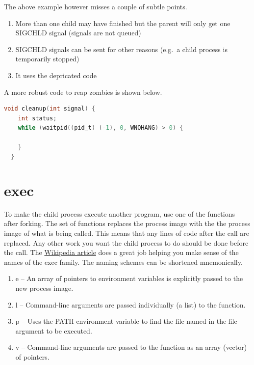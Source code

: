 The above example however misses a couple of subtle points.
\begin{enumerate}
\item More than one child may have finished but the parent will only get one SIGCHLD signal (signals are not queued)
\item SIGCHLD signals can be sent for other reasons (e.g.~a child process is temporarily stopped)
\item It uses the depricated  code
\end{enumerate}

A more robust code to reap zombies is shown below.

\begin{lstlisting}[language=C]
  void cleanup(int signal) {
    int status;
    while (waitpid((pid_t) (-1), 0, WNOHANG) > 0) {

    }
  }
\end{lstlisting}

\section{exec}

To make the child process execute another program, use one of the \href{http://man7.org/linux/man-pages/man3/exec.3.html}{} functions after forking.
The  set of functions replaces the process image with the the process image of what is being called.
This means that any lines of code after the  call are replaced.
Any other work you want the child process to do should be done before the  call.
The \href{https://en.wikipedia.org/wiki/Exec_(system_call)\#C_language_prototypes}{Wikipedia article} does a great job helping you make sense of the names of the exec family.
The naming schemes can be shortened mnemonically.

\begin{enumerate}
\item e -- An array of pointers to environment variables is explicitly passed to the new process image.
\item l -- Command-line arguments are passed individually (a list) to the function.
\item p -- Uses the PATH environment variable to find the file named in the file argument to be executed.
\item v -- Command-line arguments are passed to the function as an array (vector) of pointers.
\end{enumerate}

